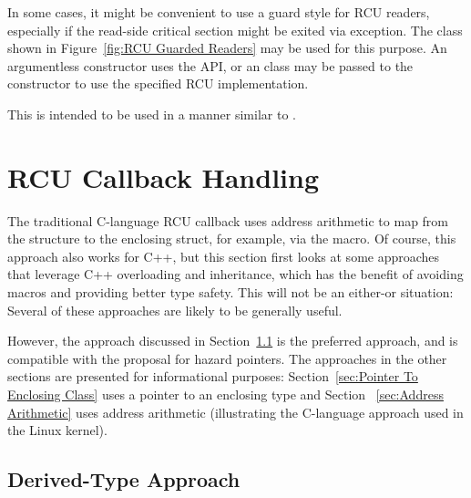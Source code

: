 \documentclass[letterpaper,10pt]{article}
\begin{document}
In some cases, it might be convenient to use a guard style for RCU readers,
especially if the read-side critical section might be exited via exception.
The  class shown in
Figure~\ref{fig:RCU Guarded Readers}
may be used for this purpose.
An argumentless constructor uses the API, or an  class
may be passed to the constructor to use the specified RCU
implementation.

This is intended to be used in a manner similar to
.

\section{RCU Callback Handling}
\label{sec:RCU Callback Handling}

The traditional C-language RCU callback uses address arithmetic
to map from the  structure to the enclosing struct,
for example, via the  macro.
Of course, this approach also works for C++, but this section first
looks at some approaches that leverage C++ overloading and inheritance,
which has the benefit of avoiding macros and providing better type safety.
This will not be an either-or situation: Several of these approaches
are likely to be generally useful.

However, the approach discussed in
Section~\ref{sec:Derived-Type Approach}
is the preferred approach, and is compatible with the proposal for
hazard pointers.
The approaches in the other sections are presented for informational
purposes:
Section~\ref{sec:Pointer To Enclosing Class}
uses a pointer to an enclosing type and
Section ~\ref{sec:Address Arithmetic}
uses address arithmetic (illustrating the C-language approach used in
the Linux kernel).

\subsection{Derived-Type Approach}
\label{sec:Derived-Type Approach}
\end{document}
